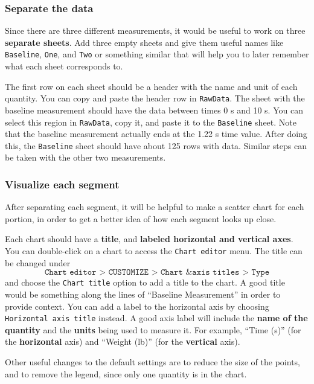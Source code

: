 \subsubsection{Separate the data}
%
Since there are three different measurements, it would be useful to work on three \textbf{separate sheets}. Add three empty sheets and give them useful names like \texttt{Baseline}, \texttt{One}, and \texttt{Two} or something similar that will help you to later remember what each sheet corresponds to.

The first row on each sheet should be a header with the name and unit of each quantity. You can copy and paste the header row in \texttt{RawData}. The sheet with the baseline measurement should have the data between times 0 s and 10 s. You can select this region in \texttt{RawData}, copy it, and paste it to the \texttt{Baseline} sheet. Note that the baseline measurement actually ends at the 1.22 s time value. After doing this, the \texttt{Baseline} sheet should have about 125 rows with data. Similar steps can be taken with the other two measurements.
%
\subsubsection{Visualize each segment}
%
After separating each segment, it will be helpful to make a scatter chart for each portion, in order to get a better idea of how each segment looks up close.

Each chart should have a \textbf{title}, and \textbf{labeled horizontal and vertical axes}. You can double-click on a chart to access the \texttt{Chart editor} menu. The title can be changed under
\begin{equation}
    \texttt{Chart editor > CUSTOMIZE > Chart \& axis titles > Type}
\end{equation}
and choose the \texttt{Chart title} option to add a title to the chart. A good title would be something along the lines of ``Baseline Measurement'' in order to provide context. You can add a label to the horizontal axis by choosing \texttt{Horizontal axis title} instead. A good axis label will include the \textbf{name of the quantity} and the \textbf{units} being used to measure it. For example, ``Time (s)'' (for the \textbf{horizontal} axis) and ``Weight (lb)'' (for the \textbf{vertical} axis).

Other useful changes to the default settings are to reduce the size of the points, and to remove the legend, since only one quantity is in the chart.
%
